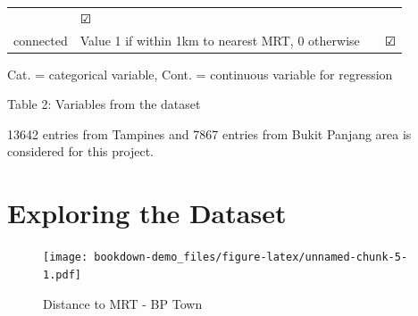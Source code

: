 \documentclass[]{book}
\newenvironment{Shaded}{\begin{snugshade}}{\end{snugshade}}
\newcommand{\KeywordTok}[1]{\textcolor[rgb]{0.13,0.29,0.53}{\textbf{#1}}}
\newcommand{\DataTypeTok}[1]{\textcolor[rgb]{0.13,0.29,0.53}{#1}}
\newcommand{\DecValTok}[1]{\textcolor[rgb]{0.00,0.00,0.81}{#1}}
\newcommand{\FloatTok}[1]{\textcolor[rgb]{0.00,0.00,0.81}{#1}}
\newcommand{\StringTok}[1]{\textcolor[rgb]{0.31,0.60,0.02}{#1}}
\newcommand{\OperatorTok}[1]{\textcolor[rgb]{0.81,0.36,0.00}{\textbf{#1}}}
\newcommand{\NormalTok}[1]{#1}
\begin{document}
\begin{longtable}[]{@{}llll@{}}
\begin{minipage}[t]{0.04\columnwidth}
\strut
\end{minipage} & \begin{minipage}[t]{0.05\columnwidth}\raggedright\strut
☑\strut
\end{minipage}\tabularnewline
\begin{minipage}[t]{0.09\columnwidth}\raggedright\strut
connected\strut
\end{minipage} & \begin{minipage}[t]{0.70\columnwidth}\raggedright\strut
Value 1 if within 1km to nearest MRT, 0 otherwise\strut
\end{minipage} & \begin{minipage}[t]{0.04\columnwidth}\raggedright\strut
\strut
\end{minipage} & \begin{minipage}[t]{0.05\columnwidth}\raggedright\strut
☑\strut
\end{minipage}\tabularnewline
\bottomrule
\end{longtable}

Cat. = categorical variable, Cont. = continuous variable for regression

Table 2: Variables from the dataset

13642 entries from Tampines and 7867 entries from Bukit Panjang area is
considered for this project.

\section{Exploring the Dataset}\label{exploring-the-dataset}

\begin{Shaded}
\end{Shaded}

\begin{figure}
\centering
\texttt{[image: bookdown-demo\_files/figure-latex/unnamed-chunk-5-1.pdf]}
\caption{\label{fig:unnamed-chunk-5}\label{fig:figs}Distance to MRT - BP
Town}
\end{figure}
\end{document}

